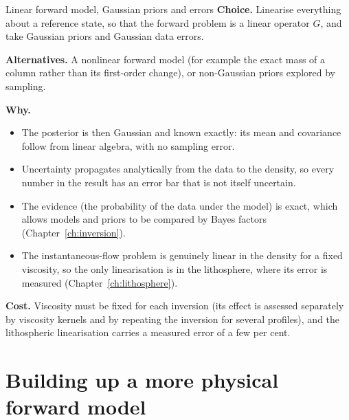 \begin{decision}{Linear forward model, Gaussian priors and errors}
\textbf{Choice.} Linearise everything about a reference state, so that the forward problem is a linear operator $G$, and take Gaussian priors and Gaussian data errors.

\textbf{Alternatives.} A nonlinear forward model (for example the exact mass of a column rather than its first-order change), or non-Gaussian priors explored by sampling.

\textbf{Why.}
\begin{itemize}[nosep]
\item The posterior is then Gaussian and known exactly: its mean and covariance follow from linear algebra, with no sampling error.
\item Uncertainty propagates analytically from the data to the density, so every number in the result has an error bar that is not itself uncertain.
\item The evidence (the probability of the data under the model) is exact, which allows models and priors to be compared by Bayes factors (Chapter~\ref{ch:inversion}).
\item The instantaneous-flow problem is genuinely linear in the density for a fixed viscosity, so the only linearisation is in the lithosphere, where its error is measured (Chapter~\ref{ch:lithosphere}).
\end{itemize}
\textbf{Cost.} Viscosity must be fixed for each inversion (its effect is assessed separately by viscosity kernels and by repeating the inversion for several profiles), and the lithospheric linearisation carries a measured error of a few per cent.
\end{decision}

\section{Building up a more physical forward model}

